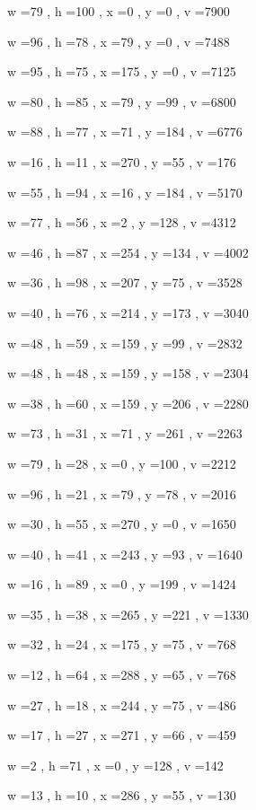 \documentclass[11pt]{article}
\begin{document}
w =79 , h =100 , x =0 , y =0 , v =7900
\par
w =96 , h =78 , x =79 , y =0 , v =7488
\par
w =95 , h =75 , x =175 , y =0 , v =7125
\par
w =80 , h =85 , x =79 , y =99 , v =6800
\par
w =88 , h =77 , x =71 , y =184 , v =6776
\par
w =16 , h =11 , x =270 , y =55 , v =176
\par
w =55 , h =94 , x =16 , y =184 , v =5170
\par
w =77 , h =56 , x =2 , y =128 , v =4312
\par
w =46 , h =87 , x =254 , y =134 , v =4002
\par
w =36 , h =98 , x =207 , y =75 , v =3528
\par
w =40 , h =76 , x =214 , y =173 , v =3040
\par
w =48 , h =59 , x =159 , y =99 , v =2832
\par
w =48 , h =48 , x =159 , y =158 , v =2304
\par
w =38 , h =60 , x =159 , y =206 , v =2280
\par
w =73 , h =31 , x =71 , y =261 , v =2263
\par
w =79 , h =28 , x =0 , y =100 , v =2212
\par
w =96 , h =21 , x =79 , y =78 , v =2016
\par
w =30 , h =55 , x =270 , y =0 , v =1650
\par
w =40 , h =41 , x =243 , y =93 , v =1640
\par
w =16 , h =89 , x =0 , y =199 , v =1424
\par
w =35 , h =38 , x =265 , y =221 , v =1330
\par
w =32 , h =24 , x =175 , y =75 , v =768
\par
w =12 , h =64 , x =288 , y =65 , v =768
\par
w =27 , h =18 , x =244 , y =75 , v =486
\par
w =17 , h =27 , x =271 , y =66 , v =459
\par
w =2 , h =71 , x =0 , y =128 , v =142
\par
w =13 , h =10 , x =286 , y =55 , v =130
\par
\newpage
\end{document}
